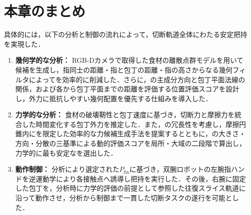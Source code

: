 \section{本章のまとめ}
\label{sec:holding_summary}

具体的には，以下の分析と制御の流れによって，切断軌道全体にわたる安定把持を実現した．

\begin{enumerate}
	\item \textbf{幾何学的な分析：} RGB-Dカメラで取得した食材の離散点群モデルを用いて{\nameholdingpointset}候補を生成し，指同士の距離・指と包丁の距離・指の高さからなる幾何フィルタによって{\namesearchspace}を効率的に削減した．さらに，{\nameholdingpointset}の主成分方向と包丁平面法線の関係，および各{\namefingerpoint}から包丁平面までの距離を評価する位置評価スコアを設計し，外力に抵抗しやすい幾何配置を優先する仕組みを導入した．
	\item \textbf{力学的な分析：} 食材の破壊靭性と包丁速度に基づき，切断力と摩擦力を統合した時間変化する包丁外力を推定した．また，{\namegraspforce}の冗長性を考慮し，摩擦円錐内に{\namefingerforce}を限定した効率的な力候補生成手法を提案するとともに，{\namefingerforce}の大きさ・方向・分散の三基準による動的評価スコアを局所・大域の二段階で算出し，力学的に最も安定な{\nameholdingpointset}を選出した．
	\item \textbf{動作制御：} 分析により選定された{\nameholdingpointset}$P_{\mathrm{fin}}$に基づき，双腕ロボットの左腕指ハンドを逆運動学により各接触点へ誘導し把持を実行した．その後，右腕に固定した包丁を，分析時に力学的評価の前提として参照した往復スライス軌道に沿って動作させ，分析から制御まで一貫した切断タスクの遂行を可能とした．
\end{enumerate}

